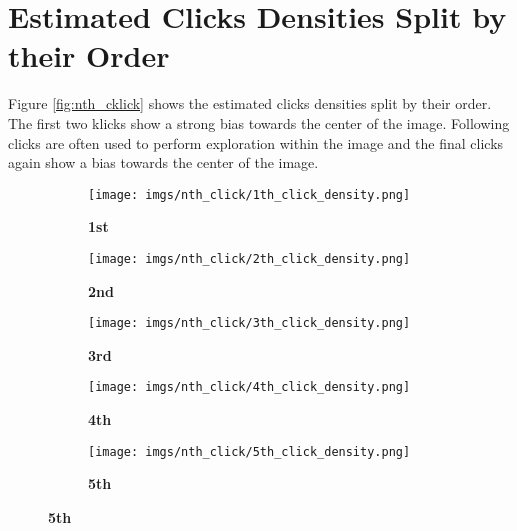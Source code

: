 \documentclass{article}
\begin{document}
\newpage
\section{Estimated Clicks Densities Split by their Order}

Figure \ref{fig:nth_cklick} shows the estimated clicks densities split by their order. The first two klicks show a strong bias towards the center of the image. Following clicks are often used to perform exploration within the image and the final clicks again show a bias towards the center of the image. 

\begin{figure}[htbp]
\captionsetup[subfigure]{labelformat=empty}

\begin{subfigure}[t]{0.195\textwidth}
    \centering
        \caption{\textbf{1st}}
    \texttt{[image: imgs/nth\_click/1th\_click\_density.png]}
  \end{subfigure}
\begin{subfigure}[t]{0.195\textwidth}
    \centering
    \caption{\textbf{2nd}}
    \texttt{[image: imgs/nth\_click/2th\_click\_density.png]}
    \label{fig:webapp_instructions}
  \end{subfigure}
\begin{subfigure}[t]{0.195\textwidth}
    \centering
    \caption{\textbf{3rd}}
    \texttt{[image: imgs/nth\_click/3th\_click\_density.png]}
    \label{fig:webapp_instructions}
  \end{subfigure}
\begin{subfigure}[t]{0.195\textwidth}
    \centering
    \caption{\textbf{4th}}
    \texttt{[image: imgs/nth\_click/4th\_click\_density.png]}
    \label{fig:webapp_instructions}
  \end{subfigure}
\begin{subfigure}[t]{0.195\textwidth}
    \centering
        \caption{\textbf{5th}}
    \texttt{[image: imgs/nth\_click/5th\_click\_density.png]}
  \end{subfigure}
  

\end{figure}
\end{document}
